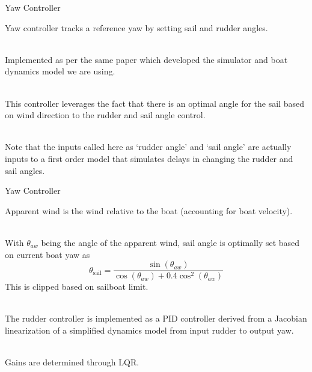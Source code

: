\documentclass[10pt,xcolor={table,dvipsnames},t]{beamer}
\begin{document}
\begin{frame}{Yaw Controller}

    Yaw controller tracks a reference yaw by setting sail and rudder angles.

    \hfill\\
    Implemented as per the same paper which developed the simulator and 
    boat dynamics model we are using\cite{Buehler2018}.
    
    \hfill\\
    This controller leverages the fact that there is an optimal angle for the sail based on wind direction to  the rudder and sail angle control.
    
    \hfill\\
    Note that the inputs called here as `rudder angle' and `sail angle' are actually
    inputs to a first order model that simulates delays in changing the rudder and sail angles.
    
\end{frame}

\begin{frame}{Yaw Controller}

    Apparent wind is the wind relative to the boat (accounting for boat velocity).
    
    \hfill\\
    With \(\theta_{aw}\) being the angle of the apparent wind, sail angle is optimally set based on current boat yaw as 
    \begin{equation}
        \theta_{\text{sail}} = \frac{\sin(\theta_{aw})}{\cos(\theta_{aw}) + 0.4\cos^2(\theta_{aw})}
    \end{equation}
    This is clipped based on sailboat limit.

    \hfill\\
    The rudder controller is implemented as a PID controller derived from a Jacobian linearization of a simplified dynamics model from input rudder to output yaw.
    
    \hfill\\
    Gains are determined through LQR.
    
\end{frame}
\end{document}
